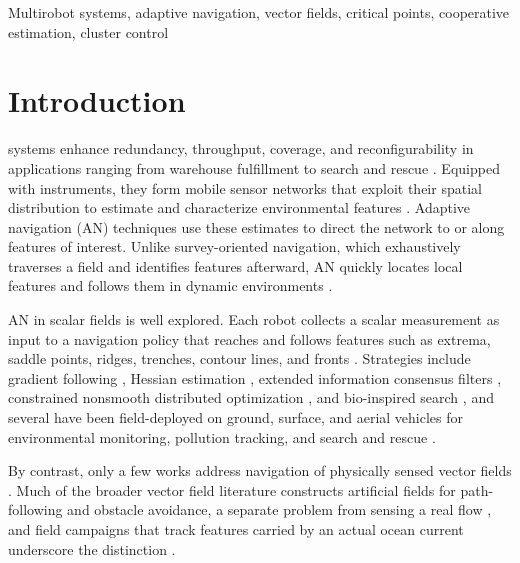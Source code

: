 \documentclass[lettersize,journal]{IEEEtran}
\begin{document}
\begin{IEEEkeywords}
Multirobot systems, adaptive navigation, vector fields, critical points, cooperative estimation, cluster control
\end{IEEEkeywords}


\section{Introduction}

 systems enhance redundancy, throughput, coverage, and reconfigurability in applications ranging from warehouse fulfillment to search and rescue \cite{1}. Equipped with instruments, they form mobile sensor networks that exploit their spatial distribution to estimate and characterize environmental features \cite{2,3,4}. Adaptive navigation (AN) techniques use these estimates to direct the network to or along features of interest. Unlike survey-oriented navigation, which exhaustively traverses a field and identifies features afterward, AN quickly locates local features and follows them in dynamic environments \cite{5,6,7}.

AN in scalar fields is well explored. Each robot collects a scalar measurement as input to a navigation policy that reaches and follows features such as extrema, saddle points, ridges, trenches, contour lines, and fronts \cite{5,6,7,8,9}. Strategies include gradient following \cite{10}, Hessian estimation \cite{4}, extended information consensus filters \cite{11,13}, constrained nonsmooth distributed optimization \cite{14}, and bio-inspired search \cite{15}, and several have been field-deployed on ground, surface, and aerial vehicles for environmental monitoring, pollution tracking, and search and rescue \cite{10,18,19,20}.

By contrast, only a few works address navigation of physically sensed vector fields \cite{21,22,23}. Much of the broader vector field literature constructs artificial fields for path-following and obstacle avoidance, a separate problem from sensing a real flow \cite{24,25,26,28}, and field campaigns that track features carried by an actual ocean current underscore the distinction \cite{29}.
\end{document}
